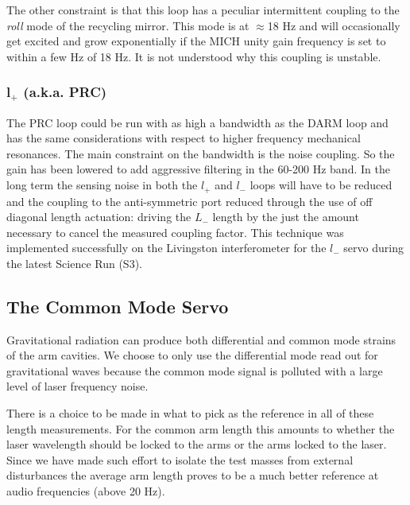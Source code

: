 The other constraint is that this loop has a peculiar intermittent coupling to the 
\emph{roll} mode of the recycling mirror. This mode is at $\approx$18 Hz and will
occasionally get excited and grow exponentially if the MICH unity gain
frequency is set to within a few Hz of 18 Hz. It is not understood why this
coupling is unstable.


\subsubsection{l$_+$ (a.k.a. PRC)}

The PRC loop could be run with as high a bandwidth as the DARM loop and has the
same considerations with respect to higher frequency mechanical resonances. The
main constraint on the bandwidth is the noise coupling. So the gain has been
lowered to add aggressive filtering in the 60-200 Hz band. In the long term
the sensing noise in both the $l_+$ and $l_-$ loops will have to be reduced and
the coupling to the anti-symmetric port reduced through the use of off
diagonal length actuation: driving the $L_-$ length by the just the amount
necessary to cancel the measured coupling factor. This technique was
implemented successfully on the Livingston interferometer for the $l_-$ 
servo during the latest Science Run (S3).



\subsection{The Common Mode Servo}
\label{sec:CMservo}
Gravitational radiation can produce both differential and common mode strains
of the arm cavities. We choose to only use the differential mode read out
for gravitational waves because the common mode signal is polluted with a
large level of laser frequency noise.

There is a choice to be made in what to pick as the reference in all of these
length measurements. For the common arm length this amounts to whether the laser
wavelength should be locked to the arms or the arms locked to the laser. Since
we have made such effort to isolate the test masses from external disturbances
the average arm length proves to be a much better reference at audio frequencies
(above 20 Hz).

